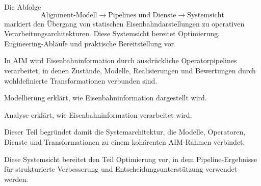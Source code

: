 Die Abfolge
\[
\text{Alignment-Modell}\rightarrow\text{Pipelines und Dienste}
\rightarrow\text{Systemsicht}
\]
markiert den Übergang von statischen Eisenbahndarstellungen zu operativen
Verarbeitungsarchitekturen. Diese Systemsicht bereitet Optimierung,
Engineering-Abläufe und praktische Bereitstellung vor.

\begin{principle}
\label{princ:pipeline-principle}
In AIM wird Eisenbahninformation durch ausdrückliche Operatorpipelines
verarbeitet, in denen Zustände, Modelle, Realisierungen und Bewertungen durch
wohldefinierte Transformationen verbunden sind.
\end{principle}

\begin{summary}
Modellierung erklärt, wie Eisenbahninformation dargestellt wird.

Analyse erklärt, wie Eisenbahninformation verarbeitet wird.

Dieser Teil begründet damit die Systemarchitektur, die Modelle, Operatoren,
Dienste und Transformationen zu einem kohärenten AIM-Rahmen verbindet.
\end{summary}

Diese Systemsicht bereitet den Teil Optimierung vor, in dem
Pipeline-Ergebnisse für strukturierte Verbesserung und
Entscheidungsunterstützung verwendet werden.
